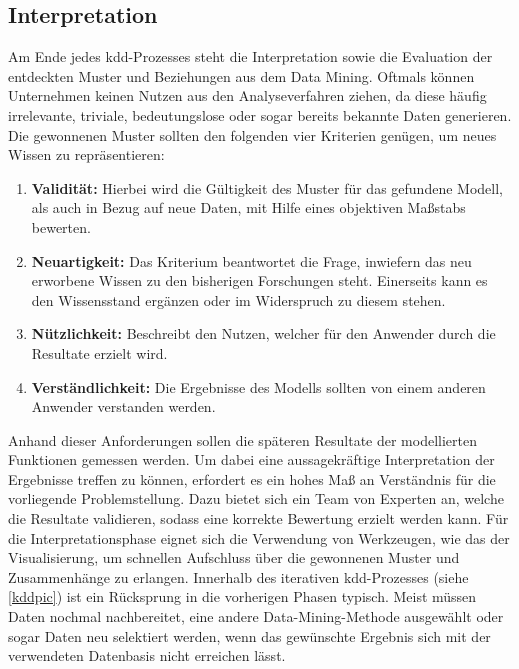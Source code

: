 \newpage
\subsection{Interpretation}
\label{int}
Am Ende jedes \gls{kdd}-Prozesses steht die Interpretation sowie die Evaluation der entdeckten Muster und Beziehungen aus dem Data Mining. Oftmals können Unternehmen keinen Nutzen aus den Analyseverfahren ziehen, da diese häufig irrelevante, triviale, bedeutungslose oder sogar bereits bekannte Daten generieren. Die gewonnenen Muster sollten den folgenden vier Kriterien genügen, um neues Wissen zu repräsentieren:

\begin{enumerate}
\item \textbf{Validität:} Hierbei wird die Gültigkeit des Muster für das gefundene Modell, als auch in Bezug auf neue Daten, mit Hilfe eines objektiven Maßstabs bewerten.
\item \textbf{Neuartigkeit:} Das Kriterium beantwortet die Frage, inwiefern das neu erworbene Wissen zu den bisherigen Forschungen steht. Einerseits kann es den Wissensstand ergänzen oder im Widerspruch zu diesem stehen.
\item \textbf{Nützlichkeit:} Beschreibt den Nutzen, welcher für den Anwender durch die Resultate erzielt wird.
\item \textbf{Verständlichkeit:} Die Ergebnisse des Modells sollten von einem anderen Anwender verstanden werden.
\end{enumerate}

Anhand dieser Anforderungen sollen die späteren Resultate der modellierten Funktionen gemessen werden. Um dabei eine aussagekräftige Interpretation der Ergebnisse treffen zu können, erfordert es ein hohes Maß an Verständnis für die vorliegende Problemstellung. Dazu bietet sich ein Team von Experten an, welche die Resultate validieren, sodass eine korrekte Bewertung erzielt werden kann. Für die Interpretationsphase eignet sich die Verwendung von Werkzeugen, wie das der Visualisierung, um schnellen Aufschluss über die gewonnenen Muster und Zusammenhänge zu erlangen. Innerhalb des iterativen \gls{kdd}-Prozesses (siehe \vref{kddpic}) ist ein Rücksprung in die vorherigen Phasen typisch. Meist müssen Daten nochmal nachbereitet, eine andere Data-Mining-Methode ausgewählt oder sogar Daten neu selektiert werden, wenn das gewünschte Ergebnis sich mit der verwendeten Datenbasis nicht erreichen lässt.